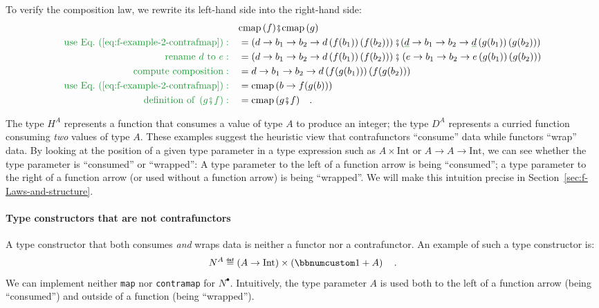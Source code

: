 To verify the composition law, we rewrite its left-hand side into
the right-hand side:
\begin{align*}
 & \text{cmap}\,(f)\bef\text{cmap}\,(g)\\
{\color{greenunder}\text{use Eq.~(\ref{eq:f-example-2-contrafmap})}:}\quad & =\left(d\rightarrow b_{1}\rightarrow b_{2}\rightarrow d\left(f(b_{1})\right)\left(f(b_{2})\right)\right)\bef(\gunderline d\rightarrow b_{1}\rightarrow b_{2}\rightarrow\gunderline d\left(g(b_{1})\right)\left(g(b_{2})\right))\\
{\color{greenunder}\text{rename }d\text{ to }e:}\quad & =\left(d\rightarrow b_{1}\rightarrow b_{2}\rightarrow d\left(f(b_{1})\right)\left(f(b_{2})\right)\right)\bef\left(e\rightarrow b_{1}\rightarrow b_{2}\rightarrow e\left(g(b_{1})\right)\left(g(b_{2})\right)\right)\\
{\color{greenunder}\text{compute composition}:}\quad & =d\rightarrow b_{1}\rightarrow b_{2}\rightarrow d\left(f(g(b_{1}))\right)\left(f(g(b_{2}))\right)\\
{\color{greenunder}\text{use Eq.~(\ref{eq:f-example-2-contrafmap})}:}\quad & =\text{cmap}\,(b\rightarrow f(g(b)))\\
{\color{greenunder}\text{definition of }\left(g\bef f\right):}\quad & =\text{cmap}\,(g\bef f)\quad.
\end{align*}

The type $H^{A}$ represents a function that consumes a value of type
$A$ to produce an integer; the type $D^{A}$ represents a curried
function consuming \emph{two} values of type $A$. These examples
suggest the heuristic view that contrafunctors \textsf{``}consume\textsf{''} data
while functors \textsf{``}wrap\textsf{''} data. By looking at the position of a given
type parameter in a type expression such as $A\times\text{Int}$ or
$A\rightarrow A\rightarrow\text{Int}$, we can see whether the type
parameter is \textsf{``}consumed\textsf{''} or \textsf{``}wrapped\textsf{''}: A type parameter to
the left of a function arrow is being \textsf{``}consumed\textsf{''}; a type parameter
to the right of a function arrow (or used without a function arrow)
is being \textsf{``}wrapped\textsf{''}. We will make this intuition precise in Section~\ref{sec:f-Laws-and-structure}.

\paragraph{Type constructors that are not contrafunctors }

A type constructor that both consumes \emph{and} wraps data is neither
a functor nor a contrafunctor. An example of such a type constructor
is:
\[
N^{A}\triangleq\left(A\rightarrow\text{Int}\right)\times\left(\bbnum 1+A\right)\quad.
\]
We can implement neither \lstinline!map! nor \lstinline!contramap!
for $N^{\bullet}$. Intuitively, the type parameter $A$ is used both
to the left of a function arrow (being \textsf{``}consumed\textsf{''}) and outside
of a function (being \textsf{``}wrapped\textsf{''}).

